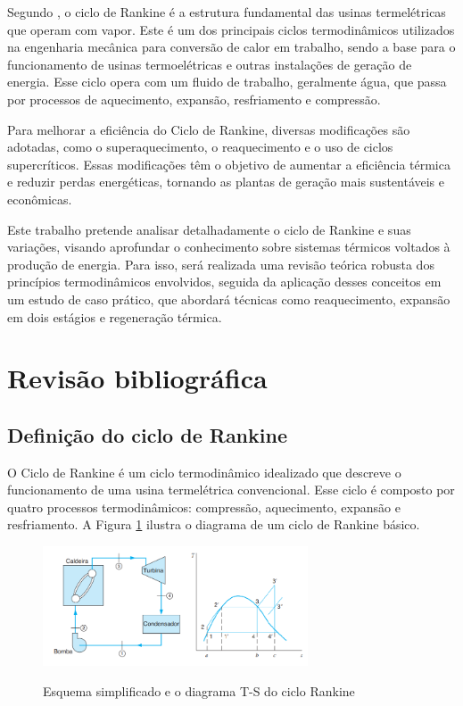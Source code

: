\documentclass[
	article,			%
	11pt,				%
	oneside,			%
	a4paper,			%
	english,			%
	brazil,				%
	sumario=tradicional
	]{abntex2}
\begin{document}
Segundo \cite{moran-2018}, o ciclo de Rankine é a estrutura fundamental das usinas termelétricas que operam com vapor. Este é um dos principais ciclos termodinâmicos utilizados na engenharia mecânica para conversão de calor em trabalho, sendo a base para o funcionamento de usinas termoelétricas e outras instalações de geração de energia. Esse ciclo opera com um fluido de trabalho, geralmente água, que passa por processos de aquecimento, expansão, resfriamento e compressão.

Para melhorar a eficiência do Ciclo de Rankine, diversas modificações são adotadas, como o superaquecimento, o reaquecimento e o uso de ciclos supercríticos. Essas modificações têm o objetivo de aumentar a eficiência térmica e reduzir perdas energéticas, tornando as plantas de geração mais sustentáveis e econômicas.

Este trabalho pretende analisar detalhadamente o ciclo de Rankine e suas variações, visando aprofundar o conhecimento sobre sistemas térmicos voltados à produção de energia. Para isso, será realizada uma revisão teórica robusta dos princípios termodinâmicos envolvidos, seguida da aplicação desses conceitos em um estudo de caso prático, que abordará técnicas como reaquecimento, expansão em dois estágios e regeneração térmica.

\section{Revisão bibliográfica}

\subsection{Definição do ciclo de Rankine}

O Ciclo de Rankine é um ciclo termodinâmico idealizado que descreve o funcionamento de uma usina termelétrica convencional. Esse ciclo é composto por quatro processos termodinâmicos: compressão, aquecimento, expansão e resfriamento. A Figura \ref{fig:esquema-simplificado-ciclo-rankine} ilustra o diagrama de um ciclo de Rankine básico.

\begin{figure}[h]
	\centering
	\caption{Esquema simplificado e o diagrama T-S do ciclo Rankine}
	\includegraphics[width=0.7\textwidth]{./images/Esquema simplificado e o diagrama T-S do ciclo Rankine.png}
	\label{fig:esquema-simplificado-ciclo-rankine}
\end{figure}
\end{document}
